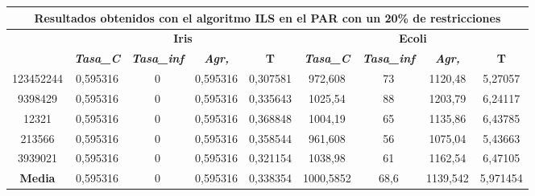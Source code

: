 \documentclass[12pt, spanish]{article}
\begin{document}
\begin{table}[H]
\begin{tabular}{|c|c|c|c|c|c|c|c|c|}
\hline
\multicolumn{9}{|c|}{\textbf{Resultados obtenidos con el algoritmo ILS en el PAR con un 20\% de restricciones}}                                                                                                   \\ \hline
\multirow{2}{*}{} & \multicolumn{4}{c|}{\textbf{Iris}}                                                            & \multicolumn{4}{c|}{\textbf{Ecoli}}                                                           \\ \cline{2-9} 
                  & \textit{\textbf{Tasa\_C}} & \textit{\textbf{Tasa\_inf}} & \textit{\textbf{Agr,}} & \textbf{T} & \textit{\textbf{Tasa\_C}} & \textit{\textbf{Tasa\_inf}} & \textit{\textbf{Agr,}} & \textbf{T} \\ \hline
123452244         & 0,595316                  & 0                           & 0,595316               & 0,307581   & 972,608                   & 73                          & 1120,48                & 5,27057    \\ \hline
9398429           & 0,595316                  & 0                           & 0,595316               & 0,335643   & 1025,54                   & 88                          & 1203,79                & 6,24117    \\ \hline
12321             & 0,595316                  & 0                           & 0,595316               & 0,368848   & 1004,19                   & 65                          & 1135,86                & 6,43785    \\ \hline
213566            & 0,595316                  & 0                           & 0,595316               & 0,358544   & 961,608                   & 56                          & 1075,04                & 5,43663    \\ \hline
3939021           & 0,595316                  & 0                           & 0,595316               & 0,321154   & 1038,98                   & 61                          & 1162,54                & 6,47105    \\ \hline
\textbf{Media}    & 0,595316                  & 0                           & 0,595316               & 0,338354   & 1000,5852                 & 68,6                        & 1139,542               & 5,971454   \\ \hline
\end{tabular}
\end{table}
\end{document}
